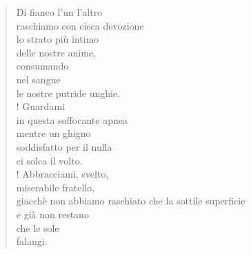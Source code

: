 
\begin{verse}
    Di fianco l'un l'altro\\
    raschiamo con cieca devozione\\
    lo strato più intimo\\
    delle nostre anime,\\
    consumando\\
    nel sangue\\
    le nostre putride unghie.\\!
    Guardami\\
    in questa soffocante apnea\\
    mentre un ghigno\\
    soddisfatto per il nulla\\
    ci solca il volto.\\!
    Abbracciami, svelto,\\
    miserabile fratello,\\
    giacchè non abbiamo raschiato che la sottile superficie\\
    e già non restano\\
    che le sole\\
    falangi.
\end{verse}